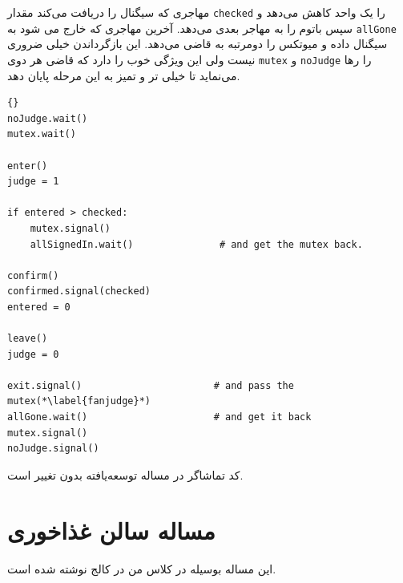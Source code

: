 \documentclass{book}
\newcommand{\clearemptydoublepage}{\newpage\cleardoublepage}
\begin{document}
    مهاجری که سیگنال را دریافت می‌کند مقدار  {\tt checked} را یک واحد کاهش می‌دهد و سپس باتوم را به مهاجر بعدی می‌دهد. 
    آخرین مهاجری که خارج می شود به {\tt allGone} سیگنال داده و میوتکس را دومرتبه به قاضی می‌دهد. این بازگرداندن خیلی ضروری نیست ولی 
    این ویژگی خوب را دارد که قاضی هر دوی  {\tt mutex} و {\tt noJudge}  را رها می‌نماید تا خیلی تر و تمیز به این مرحله پایان دهد. 

\newpage
\begin{latin}
\begin{lstlisting}[title=\rl{راهنمایی مساله تالار \lr{Faneuil} (قاضی)}]{}
noJudge.wait()
mutex.wait()

enter()
judge = 1

if entered > checked:
    mutex.signal()
    allSignedIn.wait()               # and get the mutex back.

confirm()
confirmed.signal(checked)
entered = 0

leave()
judge = 0

exit.signal()                       # and pass the mutex(*\label{fanjudge}*)
allGone.wait()                      # and get it back
mutex.signal()
noJudge.signal()
\end{lstlisting}
\end{latin}

    کد تماشاگر در مساله توسعه‌یافته بدون تغییر است. 


\clearemptydoublepage
\section{مساله سالن غذاخوری}

    این مساله بوسیله  در کلاس  من در کالج  نوشته شده است. 
\end{document}
